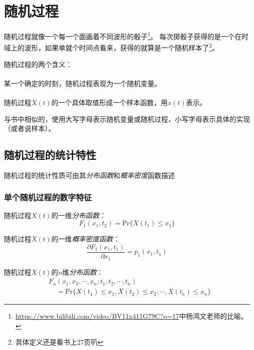 \section{随机过程}
    随机过程就像一个每一个面画着不同波形的骰子\footnote{\url{https://www.bilibili.com/video/BV11x411G79C?p=17}中杨鸿文老师的比喻。}。
    每次掷骰子获得的是一个在时域上的波形，如果单就个时间点看来，获得的就算是一个随机样本了\footnote{具体定义还是看书上27页叭}。

    随机过程的两个含义：
    \vspace{-2ex}
    \paragraph{}某一个确定的时刻，随机过程表现为一个随机变量。
    \vspace{-2ex}
    \paragraph{}随机过程$X(t)$的一个具体取值形成一个样本函数，用$x(t)$表示。
    \vspace{1ex}

    与书中相似的，使用大写字母表示随机变量或随机过程，小写字母表示具体的实现（或者说样本）。

\subsection{随机过程的统计特性}
    随机过程的统计性质可由其\emph{分布函数}和\emph{概率密度}函数描述

    \subsubsection{单个随机过程的数字特征}

    随机过程$X(t)$的一维\emph{分布函数}：
    \begin{equation}
        F_1(x_1,t_2)=\text{Pr}\{X(t_1)\leq x_1\}
    \end{equation}

    随机过程$X(t)$的一维\emph{概率密度函数}：
    \begin{equation}
        \frac{\partial F_1(x_1,t_1)}{\partial x_1}=p_1(x_1,t_1)
    \end{equation}

    随机过程$X(t)$的$n$维\emph{分布函数}：
    \begin{equation}
        \begin{split}
            &F_n(x_1,x_2,\cdots,x_n;t_1,t_2,\cdots,t_n)\\
            &\phantom{F_n}=\text{Pr}\{X(t_1)\leq x_1,X(t_2)\leq x_2,\cdots ,X(t_n)\leq x_n\}
        \end{split}
    \end{equation}

